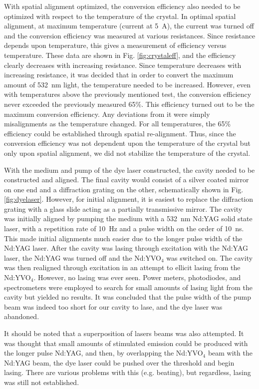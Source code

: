With spatial alignment optimized, the conversion efficiency also needed to be optimized with respect to the temperature of the crystal. In optimal spatial alignment, at maximum temperature (current at \SI{5}{ A}), the current was turned off and the conversion efficiency was measured at various resistances. Since resistance depends upon temperature, this gives a measurement of efficiency versus temperature. These data are shown in Fig. \ref{fig:crystaleff}, and the efficiency clearly decreases with increasing resistance. Since temperature decreases with increasing resistance, it was decided that in order to convert the maximum amount of \SI{532}{\nano \meter} light, the temperature needed to be increased. However, even with temperatures above the previously mentioned test, the conversion efficiency never exceeded the previously measured 65\%. This efficiency turned out to be the maximum conversion efficiency. Any deviations from it were simply misalignments as the temperature changed. For all temperatures, the 65\% efficiency could be established through spatial re-alignment. Thus, since the conversion efficiency was not dependent upon the temperature of the crystal but only upon spatial alignment, we did not stabilize the temperature of the crystal.

With the medium and pump of the dye laser constructed, the cavity needed to be constructed and aligned. The final cavity would consist of a silver coated mirror on one end and a diffraction grating on the other, schematically shown in Fig. \ref{fig:dyelaser}. However, for initial alignment, it is easiest to replace the diffraction grating with a glass slide acting as a partially transmissive mirror. The cavity was initially aligned by pumping the medium with a \SI{532}{\nano \meter} Nd:YAG solid state laser, with a repetition rate of \SI{10}{ Hz} and a pulse width on the order of \SI{10}{\nano \second}. This made initial alignments much easier due to the longer pulse width of the Nd:YAG laser. After the cavity was lasing through excitation with the Nd:YAG laser, the Nd:YAG was turned off and the Nd:YVO$_4$ was switched on. The cavity was then realigned through excitation in an attempt to ellicit lasing from the Nd:YVO$_4$. However, no lasing was ever seen. Power meters, photodiodes, and spectrometers were employed to search for small amounts of lasing light from the cavity but yielded no results. It was concluded that the pulse width of the pump beam was indeed too short for our cavity to lase, and the dye laser was abandoned.

It should be noted that a superposition of lasers beams was also attempted. It was thought that small amounts of stimulated emission could be produced with the longer pulse Nd:YAG, and then, by overlapping the Nd:YVO$_4$ beam with the Nd:YAG beam, the dye laser could be pushed over the threshold and begin lasing. There are various problems with this (e.g. beating), but regardless, lasing was still not established.

